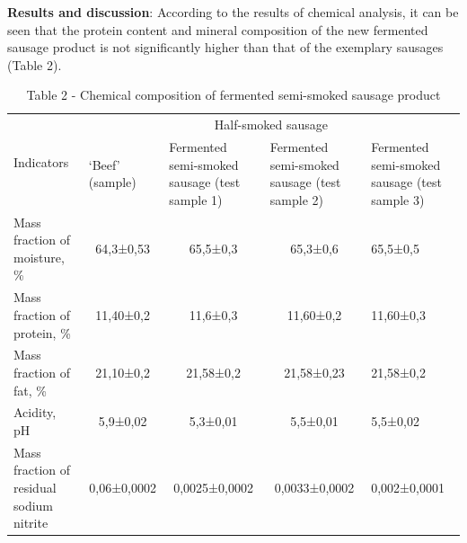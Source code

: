 {\bfseries Results and discussion}: According to the results of chemical
analysis, it can be seen that the protein content and mineral
composition of the new fermented sausage product is not significantly
higher than that of the exemplary sausages (Table 2).

\begin{table}[H]
\caption*{Table 2 - Chemical composition of fermented semi-smoked sausage product}
\centering
\begin{tabular}{|l|llll|}
\hline
\multirow{2}{*}{Indicators}              & \multicolumn{4}{c|}{Half-smoked sausage}                                                                                                                                                                                       \\ \cline{2-5} 
                                         & \multicolumn{1}{l|}{‘Beef’ (sample)} & \multicolumn{1}{p{0.15\textwidth}|}{Fermented semi-smoked sausage (test sample 1)} & \multicolumn{1}{p{0.15\textwidth}|}{Fermented semi-smoked sausage (test sample 2)} & \multicolumn{1}{p{0.15\textwidth}|}{Fermented semi-smoked sausage (test sample 3)} \\ \hline
Mass fraction of moisture, \%            & \multicolumn{1}{c|}{64,3±0,53}       & \multicolumn{1}{c|}{65,5±0,3}                                      & \multicolumn{1}{c|}{65,3±0,6}                                      & 65,5±0,5                                      \\ \hline
Mass fraction of protein, \%             & \multicolumn{1}{c|}{11,40±0,2}       & \multicolumn{1}{c|}{11,6±0,3}                                      & \multicolumn{1}{c|}{11,60±0,2}                                     & 11,60±0,3                                     \\ \hline
Mass fraction of fat, \%                 & \multicolumn{1}{c|}{21,10±0,2}       & \multicolumn{1}{c|}{21,58±0,2}                                     & \multicolumn{1}{c|}{21,58±0,23}                                    & 21,58±0,2                                     \\ \hline
Acidity, pH                              & \multicolumn{1}{c|}{5,9±0,02}        & \multicolumn{1}{c|}{5,3±0,01}                                      & \multicolumn{1}{c|}{5,5±0,01}                                      & 5,5±0,02                                      \\ \hline
\multicolumn{1}{|p{0.25\textwidth}|}{Mass fraction of residual sodium nitrite} & \multicolumn{1}{c|}{0,06±0,0002}     & \multicolumn{1}{c|}{0,0025±0,0002}                                 & \multicolumn{1}{c|}{0,0033±0,0002}                                 & 0,002±0,0001                                  \\ \hline
\end{tabular}
\end{table}

